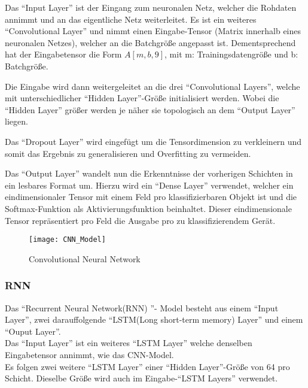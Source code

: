     \noindent
    Das "`Input Layer"' ist der Eingang zum neuronalen Netz, welcher die Rohdaten annimmt und an das eigentliche Netz weiterleitet. 
    Es ist ein weiteres "`Convolutional Layer"' und nimmt einen Eingabe-Tensor (Matrix innerhalb eines neuronalen Netzes), welcher an die Batchgröße angepasst ist.
    Dementsprechend hat der Eingabetensor die Form \( A[m, b, 9] \), mit m: Trainingsdatengröße und b: Batchgröße.
    \newline

    \noindent
    Die Eingabe wird dann weitergeleitet an die drei "`Convolutional Layers"', welche mit unterschiedlicher "`Hidden Layer"'-Größe initialisiert werden.
    Wobei die "`Hidden Layer"' größer werden je näher sie topologisch an dem "`Output Layer"' liegen.
    \newline

    \noindent
    Das "`Dropout Layer"' wird eingefügt um die Tensordimension zu verkleinern und somit das Ergebnis zu generalisieren und Overfitting zu vermeiden.
    \newline

    \noindent
    Das "`Output Layer"' wandelt nun die Erkenntnisse der vorherigen Schichten in ein lesbares Format um. 
    Hierzu wird ein "`Dense Layer"' verwendet, welcher ein eindimensionaler Tensor mit einem Feld pro klassifizierbaren Objekt ist und die Softmax-Funktion als Aktivierungsfunktion beinhaltet.
    Dieser eindimensionale Tensor repräsentiert pro Feld die Ausgabe pro zu klassifizierendem Gerät.     
    
    \begin{figure}[H]
        \centering
        \texttt{[image: CNN\_Model]}
        \caption{Convolutional Neural Network}
        \label{fig:CNN_MODEL}
    \end{figure}

    \subsubsection{RNN}
    Das "`Recurrent Neural Network(RNN) "'- Model besteht aus einem "`Input Layer"', zwei darauffolgende "`LSTM(Long short-term memory) Layer"' und einem "`Ouput Layer"'.\\
    \noindent
    Das "`Input Layer"' ist ein weiteres "`LSTM Layer"' welche denselben Eingabetensor annimmt, wie das CNN-Model.\\
    \noindent
    Es folgen zwei weitere "`LSTM Layer"' einer "`Hidden Layer"'-Größe von 64 pro Schicht.
    Dieselbe Größe wird auch im Eingabe-"`LSTM Layers"' verwendet.
    \newline

